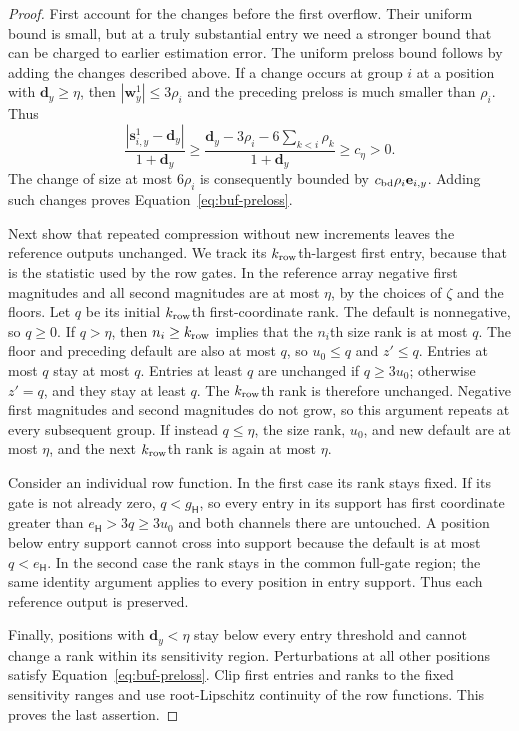 \documentclass[11pt]{article}
\numberwithin{equation}{section}
\theoremstyle{definition}
\theoremstyle{remark}
\begin{document}
\begin{proof}
First account for the changes before the first overflow. Their uniform bound is small, but at a truly substantial entry we need a stronger bound that can be charged to earlier estimation error. The uniform preloss bound follows by adding the changes described above.
If a change occurs at group $i$ at a position with ${\mathbf{d}}_y\geq\eta$, then
$|{\mathbf{w}}_y^1|\leq3\rho_i$ and the preceding preloss is much smaller than
$\rho_i$.  Thus
\[
 \frac{|{\mathbf{s}}^{1}_{i,y}-{\mathbf{d}}_y|}{1+{\mathbf{d}}_y}
 \geq \frac{{\mathbf{d}}_y-3\rho_i-6\sum_{k<i}\rho_k}{1+{\mathbf{d}}_y}
 \geq c_\eta>0.
\]
The change of size at most $6\rho_i$ is consequently bounded by
${c_{\rm bd}}\rho_i \mathbf e_{i,y}$.  Adding such changes proves
Equation~\eqref{eq:buf-preloss}.

Next show that repeated compression without new increments leaves the reference outputs unchanged. We track its ${k_{\rm row}}$th-largest first entry, because that is the statistic used by the row gates. In the reference array negative first magnitudes and all second magnitudes
are at most $\eta$, by the choices of $\zeta$ and the floors.
Let $q$ be its initial ${k_{\rm row}}$th first-coordinate rank.  The default is
nonnegative, so $q\geq0$.  If $q>\eta$, then $n_i\geq {k_{\rm row}}$ implies that the
$n_i$th size rank is at most $q$.  The floor and preceding default are
also at most $q$, so $u_0\leq q$ and $z'\leq q$.  Entries at most $q$
stay at most $q$.  Entries at least $q$ are unchanged if $q\geq3u_0$;
otherwise $z'=q$, and they stay at least $q$.  The ${k_{\rm row}}$th rank is therefore
unchanged.  Negative first magnitudes and second magnitudes do not grow,
so this argument repeats at every subsequent group.  If instead $q\leq\eta$,
the size rank, $u_0$, and new default are at most $\eta$, and the next
${k_{\rm row}}$th rank is again at most $\eta$.

Consider an individual row function.  In the first case its rank stays
fixed.  If its gate is not already zero, $q<g_{\mathsf{H}}$, so every entry in its
support has first coordinate greater than $e_{\mathsf{H}}>3q\geq3u_0$ and both
channels there are untouched.  A position below entry support cannot
cross into support because the default is at most $q<e_{\mathsf{H}}$.
In the second case the rank stays in the common full-gate region; the
same identity argument applies to every position in entry support.
Thus each reference output is preserved.

Finally, positions with ${\mathbf{d}}_y<\eta$ stay below every entry threshold and
cannot change a rank within its sensitivity region.  Perturbations at
all other positions satisfy Equation~\eqref{eq:buf-preloss}.  Clip first
entries and ranks to the fixed sensitivity ranges and use root-Lipschitz
continuity of the row functions.  This proves the last assertion.
\end{proof}
\end{document}
